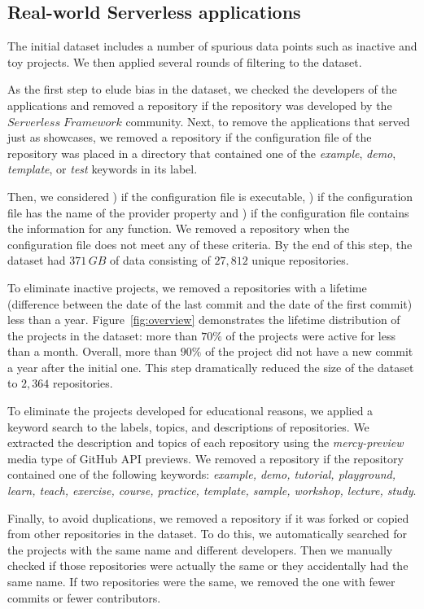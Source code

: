 \subsection{Real-world Serverless applications} \label{phaseB}
The initial dataset includes a number of spurious data points 
such as inactive and toy projects. We then applied several rounds 
of filtering to the dataset.

As the first step to elude bias in the dataset, we checked the developers 
of the applications and removed a repository if the repository was developed 
by the $Serverless \; Framework$ community. Next, to remove the applications 
that served just as showcases, we removed a repository if the configuration file 
of the repository was placed in a directory that contained one of the 
\emph{example}, \emph{demo}, \emph{template}, or \emph{test} 
keywords in its label.

Then, 
we considered ) if the configuration file is executable, ) if 
the configuration file has the name of the provider property and 
) if the configuration file contains the information for any 
function. We removed a repository when the configuration file
does not meet any of these criteria. 
%
By the end of this step, the dataset had $371 \, GB$ of data consisting 
of $27,812$ unique repositories. 

To eliminate inactive projects, we removed a repositories with a lifetime 
(difference between the date of the last commit and the date of the first commit)
less than a year. 
Figure~\ref{fig:overview} demonstrates the lifetime distribution of the 
projects in the dataset: more than $70\%$ of the projects 
were active for less than a month. Overall, more than $90\%$ 
of the project did not have a new commit a year after the initial one. 
This step dramatically reduced the size of the dataset to $2,364$ 
repositories.

To eliminate the projects developed for educational reasons, 
we applied a keyword search to the labels, topics, and 
descriptions of repositories. We extracted the description 
and topics of each repository using the \emph{mercy-preview} media 
type of GitHub API previews. We removed a repository 
if the repository contained one of the following keywords: 
\emph{example, demo, tutorial, playground, learn, teach, exercise, 
	course, practice, template, sample, workshop, lecture, study}.

Finally, to avoid duplications, we removed a repository if it was forked 
or copied from other repositories in the dataset. To do this, we automatically 
searched for the projects with the same name and different developers. 
Then we manually checked if those repositories were actually the same or 
they accidentally had the same name. If two repositories were the same, 
we removed the one with fewer commits or fewer contributors.






